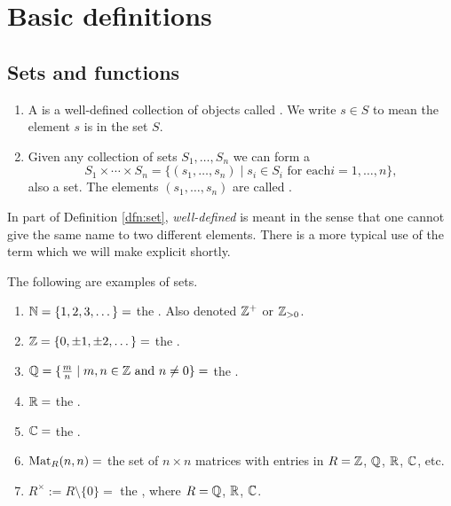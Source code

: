 \documentclass[../UNABRIDGEDalgebraNotesMSRI-UP2016.tex]{subfiles}
\begin{document}
\section[\S \thesection]{Basic definitions}\label{sec:2p1basicDefinitions}
\subsection[\subsecname]{Sets and functions}\label{subsec:setsAndFunctions}
\begin{frame}{\subsecname}{}
\begin{dfn}\label{dfn:set}
\begin{enumerate}
\item\label{dfnpt:set} 
A  is a well-defined collection of objects called .  We write $s\in S$ to mean the element $s$ is in the set $S$.
\item Given any collection of sets $S_1,\dots,S_n$ we can form a  
\[
S_1\times\cdots\times S_n=\{(s_1,\dots,s_n)\mid s_i\in S_i\text{ for each} i=1,\dots,n\},
\]
also a set.  The elements $(s_1,\dots,s_n)$ are called .
\end{enumerate}
\end{dfn}

\smallGap
In part  of Definition \ref{dfn:set}, \emph{well-defined} is meant in the sense that one cannot give the same name to two different elements.  There is a more typical use of the term which we will make explicit shortly.
\end{frame}

\begin{frame}{}{}
\begin{ex}\label{ex:sets}
The following are examples of sets.
\begin{enumerate}
\item $\mathbb N=\{1,2,3,\dots\}=$ the .  Also denoted $\mathbb Z^+$ or $\mathbb Z_{>0}$.
\item $\mathbb Z=\{0,\pm 1, \pm 2,\dots\}=$ the .
\item $\mathbb Q=\{\frac{m}{n}\mid m,n\in \mathbb Z\text{ and }n\neq 0\}=$ the .
\item $\mathbb R=$ the .
\item $\mathbb C=$ the .
\item $\operatorname{Mat}_{R}(n,n)=$ the set of $n\times n$ matrices with entries in $R=\mathbb Z$, $\mathbb Q$, $\mathbb R$, $\mathbb C$, etc.
\item $R^{\times}:=R\setminus\{0\}=$ the , where $R=\mathbb Q$, $\mathbb R$, $\mathbb C$.
\end{enumerate}
\end{ex}
\end{frame}
\end{document}
